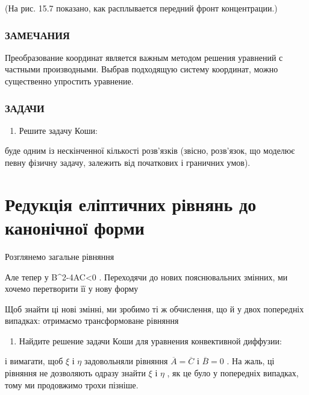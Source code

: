\documentclass[
  ukrainian,
]{article}
\providecommand{\tightlist}{%
  \setlength{\itemsep}{0pt}\setlength{\parskip}{0pt}}
\begin{document}
(На рис. 15.7 показано, как расплывается передний фронт концентрации.)

\subsubsection{ЗАМЕЧАНИЯ}\label{ux437ux430ux43cux435ux447ux430ux43dux438ux44f-16}

Преобразование координат является важным методом решения уравнений с
частными производными. Выбрав подходящую систему координат, можно
существенно упростить уравнение.

\subsubsection{ЗАДАЧИ}\label{ux437ux430ux434ux430ux447ux438-19}

\begin{enumerate}
\def\labelenumi{\arabic{enumi}.}
\tightlist
\item
  Решите задачу Коши:
\end{enumerate}

буде одним із нескінченної кількості розв'язків (звісно, розв'язок, що
моделює певну фізичну задачу, залежить від початкових і граничних умов).

\section{Редукція еліптичних рівнянь до канонічної
форми}\label{ux440ux435ux434ux443ux43aux446ux456ux44f-ux435ux43bux456ux43fux442ux438ux447ux43dux438ux445-ux440ux456ux432ux43dux44fux43dux44c-ux434ux43e-ux43aux430ux43dux43eux43dux456ux447ux43dux43eux457-ux444ux43eux440ux43cux438}

Розглянемо загальне рівняння

Але тепер у B\^{}2-4AC\textless0 . Переходячи до нових пояснювальних
змінних, ми хочемо перетворити її у нову форму

Щоб знайти ці нові змінні, ми зробимо ті ж обчислення, що й у двох
попередніх випадках: отримаємо трансформоване рівняння

\begin{enumerate}
\def\labelenumi{\arabic{enumi}.}
\setcounter{enumi}{1}
\tightlist
\item
  Найдите решение задачи Коши для уравнения конвективной диффузии:
\end{enumerate}

і вимагати, щоб \(\xi\) і \(\eta\) задовольняли рівняння
\(\overline{A}=\overline{C}\) і \(\overline{B}=0\) . На жаль, ці
рівняння не дозволяють одразу знайти \(\xi\) і \(\eta\) , як це було у
попередніх випадках, тому ми продовжимо трохи пізніше.
\end{document}
